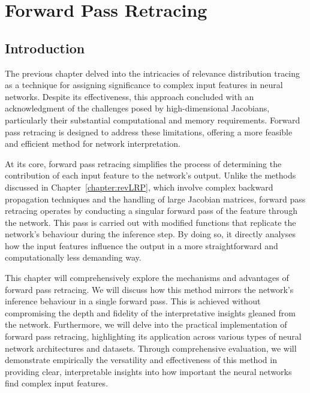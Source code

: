 \chapter{Forward Pass Retracing }
\label{chapter:REVEAL}
\newcommand{\cnet}[1][k]{\text{$c$-}\net[#1]}
\newcommand{\lo}[1][j]{l_{#1}}
\newcommand{\clo}[1][j]{\text{$c$-}\lo[#1]}
\newcommand{\djo}[1][j]{d_{#1}}
\newcommand{\NN}{\mathcal{N}}
\newcommand{\HM}{\mathcal{H}}
\newcommand{\cdjo}[1][j]{\text{$c$-}\djo[#1]}
\newcommand{\passto}{\hookrightarrow}
\section{Introduction}


The previous chapter delved into the intricacies of relevance distribution tracing as a technique for assigning significance to complex input features in neural networks. Despite its effectiveness, this approach concluded with an acknowledgment of the challenges posed by high-dimensional Jacobians, particularly their substantial computational and memory requirements. Forward pass retracing is designed to address these limitations, offering a more feasible and efficient method for network interpretation.

At its core, forward pass retracing simplifies the process of determining the contribution of each input feature to the network's output. Unlike the methods discussed in Chapter~\ref{chapter:revLRP}, which involve complex backward propagation techniques and the handling of large Jacobian matrices, forward pass retracing operates by conducting a singular forward pass of the feature through the network. This pass is carried out with modified functions that replicate the network's behaviour during the inference step. By doing so, it directly analyses how the input features influence the output in a more straightforward and computationally less demanding way.

This chapter will comprehensively explore the mechanisms and advantages of forward pass retracing. We will discuss how this method mirrors the network's inference behaviour in a single forward pass. This is achieved without compromising the depth and fidelity of the interpretative insights gleaned from the network. Furthermore, we will delve into the practical implementation of forward pass retracing, highlighting its application across various types of neural network architectures and datasets. Through comprehensive evaluation, we will demonstrate empirically the versatility and effectiveness of this method in providing clear, interpretable insights into how important the neural networks find complex input features. 


